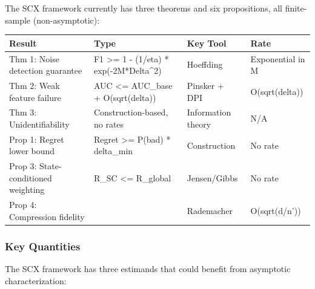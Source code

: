 \documentclass[
  12pt,
]{article}
\begin{document}
The SCX framework currently has three theorems and six propositions, all
finite-sample (non-asymptotic):

\begin{longtable}[]{@{}
  >{\raggedright\arraybackslash}p{}
  >{\raggedright\arraybackslash}p{}
  >{\raggedright\arraybackslash}p{}
  >{\raggedright\arraybackslash}p{}@{}}
\toprule\noalign{}
\begin{minipage}[b]{\linewidth}\raggedright
Result
\end{minipage} & \begin{minipage}[b]{\linewidth}\raggedright
Type
\end{minipage} & \begin{minipage}[b]{\linewidth}\raggedright
Key Tool
\end{minipage} & \begin{minipage}[b]{\linewidth}\raggedright
Rate
\end{minipage} \\
\midrule\noalign{}
\endhead
\bottomrule\noalign{}
\endlastfoot
Thm 1: Noise detection guarantee & F1 \textgreater= 1 - (1/eta) *
exp(-2M*Delta\^{}2) & Hoeffding & Exponential in M \\
Thm 2: Weak feature failure & AUC \textless= AUC\_base + O(sqrt(delta))
& Pinsker + DPI & O(sqrt(delta)) \\
Thm 3: Unidentifiability & Construction-based, no rates & Information
theory & N/A \\
Prop 1: Regret lower bound & Regret \textgreater= P(bad) * delta\_min &
Construction & No rate \\
Prop 3: State-conditioned weighting & R\_SC \textless= R\_global &
Jensen/Gibbs & No rate \\
Prop 4: Compression fidelity & & Rademacher & O(sqrt(d/n')) \\
\end{longtable}

\subsubsection{Key Quantities}\label{key-quantities}

The SCX framework has three estimands that could benefit from asymptotic
characterization:
\end{document}
